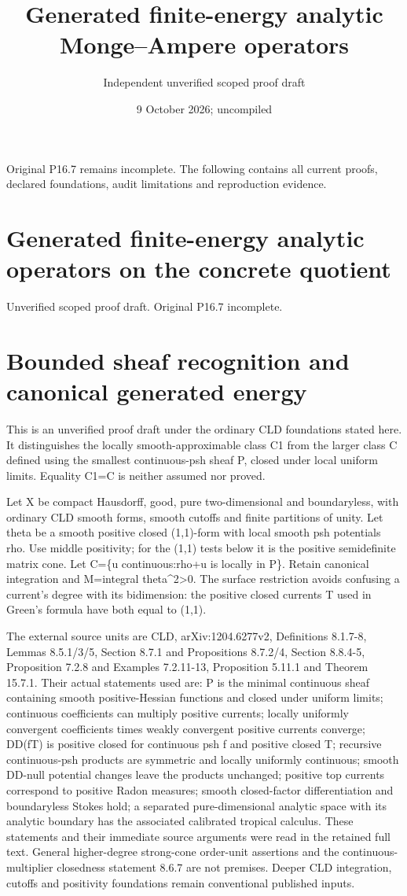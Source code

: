 \documentclass[11pt]{article}
\title{Generated finite-energy analytic Monge--Ampere operators}
\author{Independent unverified scoped proof draft}
\date{9 October 2026; uncompiled}
\begin{document}
\maketitle
Original P16.7 remains incomplete. The following contains all current
proofs, declared foundations, audit limitations and reproduction evidence.
\section*{Generated finite-energy analytic operators on the concrete quotient}

Unverified scoped proof draft. Original P16.7 incomplete.

\section*{Bounded sheaf recognition and canonical generated energy}

This is an unverified proof draft under the ordinary CLD foundations stated here. It distinguishes the locally smooth-approximable class C1 from the larger class C defined using the smallest continuous-psh sheaf P, closed under local uniform limits. Equality C1=C is neither assumed nor proved.

Let X be compact Hausdorff, good, pure two-dimensional and boundaryless, with ordinary CLD smooth forms, smooth cutoffs and finite partitions of unity. Let theta be a smooth positive closed (1,1)-form with local smooth psh potentials rho. Use middle positivity; for the (1,1) tests below it is the positive semidefinite matrix cone. Let C=\{u continuous:rho+u is locally in P\}. Retain canonical integration and M=integral theta\textasciicircum{}2>0. The surface restriction avoids confusing a current's degree with its bidimension: the positive closed currents T used in Green's formula have both equal to (1,1).

The external source units are CLD, arXiv:1204.6277v2, Definitions 8.1.7-8, Lemmas 8.5.1/3/5, Section 8.7.1 and Propositions 8.7.2/4, Section 8.8.4-5, Proposition 7.2.8 and Examples 7.2.11-13, Proposition 5.11.1 and Theorem 15.7.1. Their actual statements used are: P is the minimal continuous sheaf containing smooth positive-Hessian functions and closed under uniform limits; continuous coefficients can multiply positive currents; locally uniformly convergent coefficients times weakly convergent positive currents converge; DD(fT) is positive closed for continuous psh f and positive closed T; recursive continuous-psh products are symmetric and locally uniformly continuous; smooth DD-null potential changes leave the products unchanged; positive top currents correspond to positive Radon measures; smooth closed-factor differentiation and boundaryless Stokes hold; a separated pure-dimensional analytic space with its analytic boundary has the associated calibrated tropical calculus. These statements and their immediate source arguments were read in the retained full text. General higher-degree strong-cone order-unit assertions and the continuous-multiplier closedness statement 8.6.7 are not premises. Deeper CLD integration, cutoffs and positivity foundations remain conventional published inputs.
\end{document}
